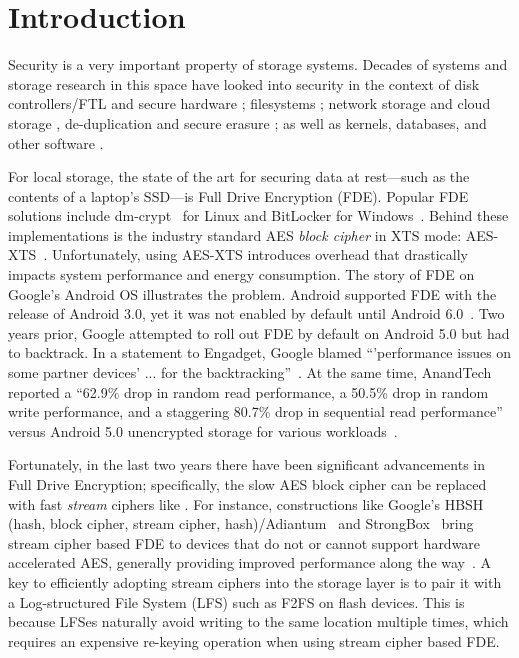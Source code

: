 \section{Introduction}\label{sec:introduction}


Security is a very important property of storage systems. Decades of systems and
storage research in this space have looked into security in the context of disk
controllers/FTL and secure hardware \cite{hardware1, hardware2, hardware3,
hardware4}; filesystems \cite{filesystems1, filesystems2, filesystems3,
filesystems4, filesystems5, filesystems6, filesystems7}; network storage and
cloud storage \cite{network1, network2, network3, network4, network5, network6,
network7, network8, network9, network10, network11, network12, network13,
network14, network15, network16}, de-duplication and secure erasure
\cite{erase1, erase2, erase3}; as well as kernels, databases, and other software
\cite{software1, software2, software3, software4}.

For local storage, the state of the art for securing data at rest---such as the
contents of a laptop's SSD---is Full Drive Encryption (FDE). Popular FDE
solutions include dm-crypt~\cite{dmcrypt, DmC-Android} for Linux and BitLocker
for Windows~\cite{bitlocker1, bitlocker2}. Behind these implementations is the
industry standard AES {\em block cipher} in XTS mode: AES-XTS~\cite{XTS,
XTSComments, NISTXTS}. Unfortunately, using AES-XTS introduces overhead that
drastically impacts system performance and energy consumption. The story of FDE
on Google's Android OS illustrates the problem. Android supported FDE with the
release of Android 3.0, yet it was not enabled by default until Android
6.0~\cite{android-M-mobile-motivation}. Two years prior, Google attempted to
roll out FDE by default on Android 5.0 but had to backtrack. In a statement to
Engadget, Google blamed ``'performance issues on some partner devices' ... for
the backtracking''~\cite{google-engadget}. At the same time, AnandTech reported
a ``62.9\% drop in random read performance, a 50.5\% drop in random write
performance, and a staggering 80.7\% drop in sequential read performance''
versus Android 5.0 unencrypted storage for various
workloads~\cite{android-M-mobile-motivation-2}.

Fortunately, in the last two years there have been significant advancements in
Full Drive Encryption; specifically, the slow AES block cipher can be replaced
with fast {\em stream} ciphers like \encB. For instance, constructions like
Google's HBSH (hash, block cipher, stream cipher, hash)/Adiantum~\cite{Adiantum}
and StrongBox~\cite{StrongBox} bring stream cipher based FDE to devices that do
not or cannot support hardware accelerated AES, generally providing improved
performance along the way~\cite{StrongBox}. A key to efficiently adopting stream
ciphers into the storage layer is to pair it with a Log-structured File System
(LFS) such as F2FS on flash devices. This is because LFSes naturally avoid
writing to the same location multiple times, which requires an expensive
re-keying operation when using stream cipher based FDE.

